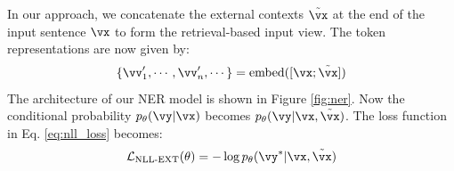\documentclass[11pt,a4paper]{article}
\newcommand{\mcL}{\mathcal{L}}
\begin{document}
In our approach, we concatenate the external contexts $\tilde{\vx}$ at the end of the input sentence $\vx$ to form the retrieval-based input view. %
The token representations are now given by:
\begin{displaymath}
\{\vv_1^{\prime},\cdots,\vv^{\prime}_n,\cdots\} = \text{embed} ([\vx;\tilde{\vx}])
\end{displaymath}
The architecture of our NER model is shown in Figure \ref{fig:ner}. Now the conditional probability $p_\theta(\vy|\vx)$ becomes $p_\theta(\vy|\vx, \tilde{\vx})$. 
The loss function in Eq. \ref{eq:nll_loss} becomes:
\begin{align}
\mcL_{\text{NLL-EXT}}(\theta) = - \log p_\theta(\vy^*|\vx,\tilde{\vx}) \label{eq:nll_loss_x}
\end{align}

\end{document}
